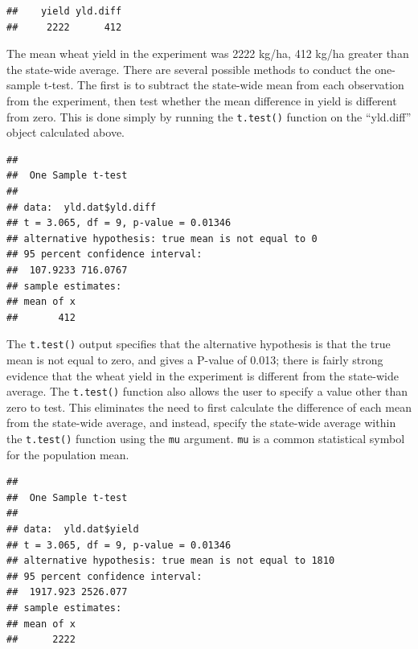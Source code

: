 \documentclass[letterpaper,]{book}
\newenvironment{Shaded}{\begin{snugshade}}{\end{snugshade}}
\newcommand{\DataTypeTok}[1]{\textcolor[rgb]{0.13,0.29,0.53}{#1}}
\newcommand{\DecValTok}[1]{\textcolor[rgb]{0.00,0.00,0.81}{#1}}
\newcommand{\KeywordTok}[1]{\textcolor[rgb]{0.13,0.29,0.53}{\textbf{#1}}}
\newcommand{\NormalTok}[1]{#1}
\newcommand{\OperatorTok}[1]{\textcolor[rgb]{0.81,0.36,0.00}{\textbf{#1}}}
\begin{document}
\begin{verbatim}
##    yield yld.diff 
##     2222      412
\end{verbatim}

The mean wheat yield in the experiment was 2222 kg/ha, 412 kg/ha greater than the state-wide average. There are several possible methods to conduct the one-sample t-test. The first is to subtract the state-wide mean from each observation from the experiment, then test whether the mean difference in yield is different from zero. This is done simply by running the \texttt{t.test()} function on the ``yld.diff'' object calculated above.

\begin{Shaded}
\end{Shaded}

\begin{verbatim}
## 
##  One Sample t-test
## 
## data:  yld.dat$yld.diff
## t = 3.065, df = 9, p-value = 0.01346
## alternative hypothesis: true mean is not equal to 0
## 95 percent confidence interval:
##  107.9233 716.0767
## sample estimates:
## mean of x 
##       412
\end{verbatim}

The \texttt{t.test()} output specifies that the alternative hypothesis is that the true mean is not equal to zero, and gives a P-value of 0.013; there is fairly strong evidence that the wheat yield in the experiment is different from the state-wide average. The \texttt{t.test()} function also allows the user to specify a value other than zero to test. This eliminates the need to first calculate the difference of each mean from the state-wide average, and instead, specify the state-wide average within the \texttt{t.test()} function using the \texttt{mu} argument. \texttt{mu} is a common statistical symbol for the population mean.

\begin{Shaded}
\end{Shaded}

\begin{verbatim}
## 
##  One Sample t-test
## 
## data:  yld.dat$yield
## t = 3.065, df = 9, p-value = 0.01346
## alternative hypothesis: true mean is not equal to 1810
## 95 percent confidence interval:
##  1917.923 2526.077
## sample estimates:
## mean of x 
##      2222
\end{verbatim}
\end{document}
